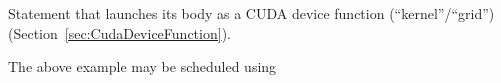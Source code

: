 
Statement that launches its body as a CUDA device function (``kernel''/``grid'') (Section~\ref{sec:CudaDeviceFunction}).



The above example may be scheduled using



